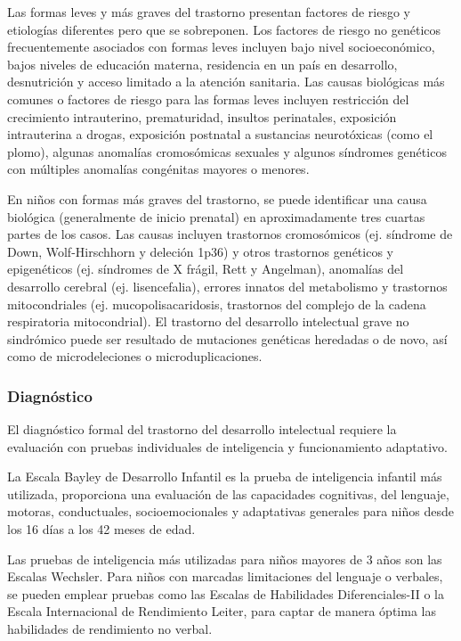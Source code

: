 \documentclass[11pt,letterpaper]{report}
\begin{document}
Las formas leves y más graves del trastorno presentan factores de riesgo y
etiologías diferentes pero que se sobreponen. Los factores de riesgo no
genéticos frecuentemente asociados con formas leves incluyen bajo nivel
socioeconómico, bajos niveles de educación materna, residencia en un país en
desarrollo, desnutrición y acceso limitado a la atención sanitaria. Las causas
biológicas más comunes o factores de riesgo para las formas leves incluyen
restricción del crecimiento intrauterino, prematuridad, insultos perinatales,
exposición intrauterina a drogas, exposición postnatal a sustancias
neurotóxicas (como el plomo), algunas anomalías cromosómicas sexuales y algunos
síndromes genéticos con múltiples anomalías congénitas mayores o menores.
\cite{Nelson56}

En niños con formas más graves del trastorno, se puede identificar una causa
biológica (generalmente de inicio prenatal) en aproximadamente tres cuartas
partes de los casos. Las causas incluyen trastornos cromosómicos (ej. síndrome
de Down, Wolf-Hirschhorn y deleción 1p36) y otros trastornos genéticos y
epigenéticos (ej. síndromes de X frágil, Rett y Angelman), anomalías del
desarrollo cerebral (ej. lisencefalia), errores innatos del metabolismo y
trastornos mitocondriales (ej. mucopolisacaridosis, trastornos del complejo de
la cadena respiratoria mitocondrial). El trastorno del desarrollo intelectual
grave no sindrómico puede ser resultado de mutaciones genéticas heredadas o de
novo, así como de microdeleciones o microduplicaciones. \cite{Nelson56}

\subsubsection{Diagnóstico}
El diagnóstico formal del trastorno del desarrollo intelectual requiere la
evaluación con pruebas individuales de inteligencia y funcionamiento
adaptativo.

La Escala Bayley de Desarrollo Infantil es la prueba de inteligencia infantil
más utilizada, proporciona una evaluación de las capacidades cognitivas, del
lenguaje, motoras, conductuales, socioemocionales y adaptativas generales para
niños desde los 16 días a los 42 meses de edad. \cite{Nelson56}

Las pruebas de inteligencia más utilizadas para niños mayores de 3 años son las
Escalas Wechsler. Para niños con marcadas limitaciones del lenguaje o verbales,
se pueden emplear pruebas como las Escalas de Habilidades Diferenciales-II o la
Escala Internacional de Rendimiento Leiter, para captar de manera óptima las
habilidades de rendimiento no verbal. \cite{Nelson56}
\end{document}
